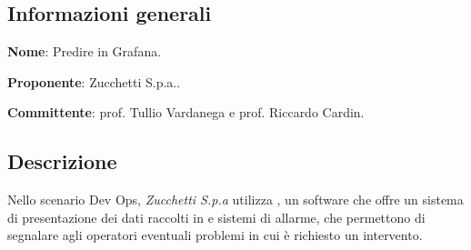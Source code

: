 \documentclass[../studio-di-fattibilita.tex]{subfiles}
\begin{document}
\subsection{Informazioni generali}%
\label{sub:informazioni_generale}
\begin{description}
  \item \textbf{Nome}: Predire in Grafana.
  \item \textbf{Proponente}: Zucchetti S.p.a..
  \item \textbf{Committente}: prof. Tullio Vardanega e prof. Riccardo Cardin.
\end{description}

\subsection{Descrizione}%
\label{sub:descrizione}
Nello scenario Dev Ops, \emph{Zucchetti S.p.a} utilizza , un software  che offre un sistema di presentazione dei dati raccolti in  e sistemi di allarme, che permettono di segnalare agli operatori eventuali problemi in cui è richiesto un intervento.
\end{document}
